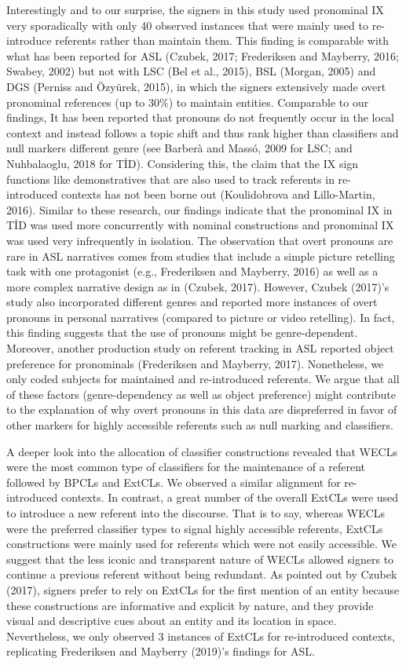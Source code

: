 \documentclass[]{elsarticle} %
\begin{document}
Interestingly and to our surprise, the signers in this study used
pronominal IX very sporadically with only 40 observed instances that
were mainly used to re-introduce referents rather than maintain them.
This finding is comparable with what has been reported for ASL (Czubek,
2017; Frederiksen and Mayberry, 2016; Swabey, 2002) but not with LSC
(Bel et al., 2015), BSL (Morgan, 2005) and DGS (Perniss and Özyürek,
2015), in which the signers extensively made overt pronominal references
(up to 30\%) to maintain entities. Comparable to our findings, It has
been reported that pronouns do not frequently occur in the local context
and instead follows a topic shift and thus rank higher than classifiers
and null markers different genre (see Barberà and Massó, 2009 for LSC;
and Nuhbalaoglu, 2018 for TİD). Considering this, the claim that the IX
sign functions like demonstratives that are also used to track referents
in re-introduced contexts has not been borne out (Koulidobrova and
Lillo-Martin, 2016). Similar to these research, our findings indicate
that the pronominal IX in TİD was used more concurrently with nominal
constructions and pronominal IX was used very infrequently in isolation.
The observation that overt pronouns are rare in ASL narratives comes
from studies that include a simple picture retelling task with one
protagonist (e.g., Frederiksen and Mayberry, 2016) as well as a more
complex narrative design as in (Czubek, 2017). However, Czubek (2017)'s
study also incorporated different genres and reported more instances of
overt pronouns in personal narratives (compared to picture or video
retelling). In fact, this finding suggests that the use of pronouns
might be genre-dependent. Moreover, another production study on referent
tracking in ASL reported object preference for pronominals (Frederiksen
and Mayberry, 2017). Nonetheless, we only coded subjects for maintained
and re-introduced referents. We argue that all of these factors
(genre-dependency as well as object preference) might contribute to the
explanation of why overt pronouns in this data are dispreferred in favor
of other markers for highly accessible referents such as null marking
and classifiers.

A deeper look into the allocation of classifier constructions revealed
that WECLs were the most common type of classifiers for the maintenance
of a referent followed by BPCLs and ExtCLs. We observed a similar
alignment for re-introduced contexts. In contrast, a great number of the
overall ExtCLs were used to introduce a new referent into the discourse.
That is to say, whereas WECLs were the preferred classifier types to
signal highly accessible referents, ExtCLs constructions were mainly
used for referents which were not easily accessible. We suggest that the
less iconic and transparent nature of WECLs allowed signers to continue
a previous referent without being redundant. As pointed out by Czubek
(2017), signers prefer to rely on ExtCLs for the first mention of an
entity because these constructions are informative and explicit by
nature, and they provide visual and descriptive cues about an entity and
its location in space. Nevertheless, we only observed 3 instances of
ExtCLs for re-introduced contexts, replicating Frederiksen and Mayberry
(2019)'s findings for ASL.
\end{document}
